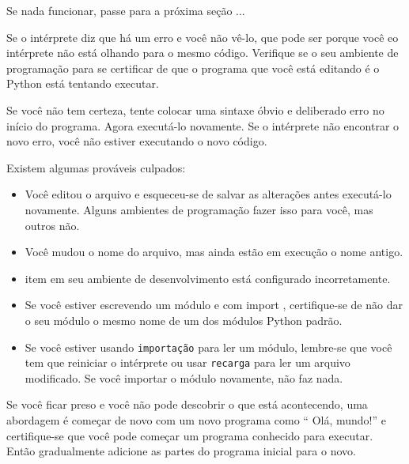 \documentclass[10pt]{book}
\begin{document}
\begin{v erbatim}
\begin{enumerate}
{\end{enumerate}

Se nada funcionar, passe para a próxima seção ...



Se o intérprete diz que há um erro e você não vê-lo, que
pode ser porque você eo intérprete não está olhando para o mesmo
código. Verifique se o seu ambiente de programação para se certificar de que o
programa que você está editando é o Python está tentando executar.

Se você não tem certeza, tente colocar uma sintaxe óbvio e deliberado
erro no início do programa. Agora executá-lo novamente. Se o
intérprete não encontrar o novo erro, você não estiver executando o
novo código.

Existem algumas prováveis ​​culpados:

\begin{itemize}

\item Você editou o arquivo e esqueceu-se de salvar as alterações antes
executá-lo novamente. Alguns ambientes de programação fazer isso
para você, mas outros não.

\item Você mudou o nome do arquivo, mas ainda estão em execução
o nome antigo.

\item item em seu ambiente de desenvolvimento está configurado
incorretamente.

\item Se você estiver escrevendo um módulo e com {import \tt},
certifique-se de não dar o seu módulo o mesmo nome de um
dos módulos Python padrão.

\item Se você estiver usando {\tt importação} para ler um módulo, lembre-se
que você tem que reiniciar o intérprete ou usar {\tt recarga}
para ler um arquivo modificado. Se você importar o módulo novamente,
não faz nada.

\end{itemize}

Se você ficar preso e você não pode descobrir o que está acontecendo, uma
abordagem é começar de novo com um novo programa como `` Olá, mundo!''
e certifique-se que você pode começar um programa conhecido para executar. Então gradualmente adicione
as partes do programa inicial para o novo.



\end{v erbatim}
\end{document}
